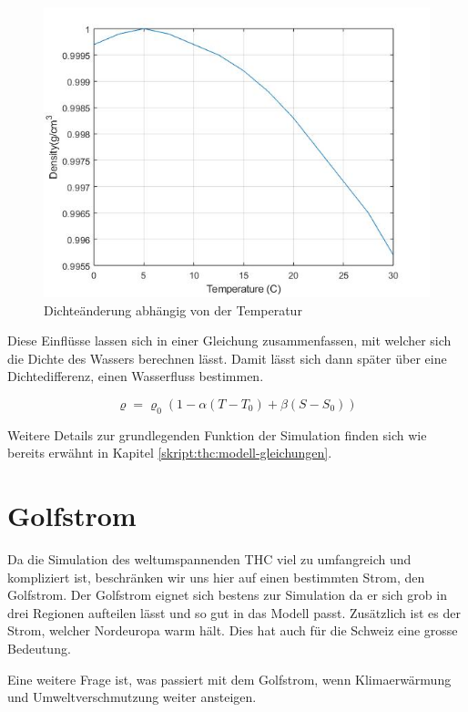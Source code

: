 \begin{figure}
	\centering
	\includegraphics[width=12cm]{thermohalin/Code/graphs/graph_temp.jpg}
	\caption{Dichteänderung abhängig von der Temperatur}
\end{figure}

 Diese Einflüsse lassen sich in einer Gleichung zusammenfassen, mit welcher sich die Dichte des Wassers berechnen lässt. Damit lässt sich dann später über eine Dichtedifferenz, einen Wasserfluss bestimmen.
 

\begin{equation}
\varrho
=
\varrho_0(1-\alpha(T-T_0)+\beta(S-S_0))
\label{skript:salinity-linear}
\end{equation} 

Weitere Details zur grundlegenden Funktion der Simulation finden sich wie bereits erwähnt in Kapitel \ref{skript:thc:modell-gleichungen}.


\section{Golfstrom}

Da die Simulation des weltumspannenden THC viel zu umfangreich und kompliziert ist, beschränken wir uns hier auf einen bestimmten Strom, den Golfstrom.
Der Golfstrom eignet sich bestens zur Simulation da er sich grob in drei Regionen aufteilen lässt und so gut in das Modell passt. Zusätzlich ist es der Strom, welcher Nordeuropa warm hält.  Dies hat auch für die Schweiz eine grosse Bedeutung.

Eine weitere Frage ist, was passiert mit dem Golfstrom, wenn Klimaerwärmung und Umweltverschmutzung weiter ansteigen.

